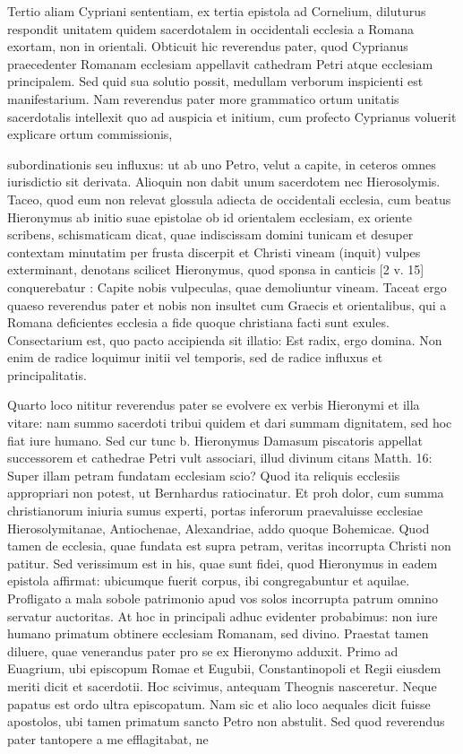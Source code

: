 Tertio aliam Cypriani sententiam, ex tertia epistola ad Cornelium, diluturus respondit unitatem quidem sacerdotalem in occidentali ecclesia a Romana exortam, non in orientali. Obticuit hic reverendus pater, quod Cyprianus praecedenter Romanam ecclesiam appellavit cathedram Petri atque ecclesiam principalem. Sed quid sua solutio possit, medullam verborum inspicienti est manifestarium. Nam reverendus pater more grammatico ortum unitatis sacerdotalis intellexit quo ad auspicia et initium, cum profecto Cyprianus voluerit explicare ortum commissionis,

subordinationis seu influxus: ut ab uno Petro, velut a capite, in ceteros omnes iurisdictio sit derivata. Alioquin non dabit unum sacerdotem nec Hierosolymis. Taceo, quod eum non relevat glossula adiecta de occidentali ecclesia, cum beatus Hieronymus ab initio suae epistolae ob id orientalem ecclesiam, ex oriente scribens, schismaticam dicat, quae indiscissam domini tunicam et desuper contextam minutatim per frusta discerpit et Christi vineam (inquit) vulpes exterminant, denotans scilicet Hieronymus, quod sponsa in canticis [2 v. 15] conquerebatur \marginpar{\small[262]}: Capite nobis vulpeculas, quae demoliuntur vineam. Taceat ergo quaeso reverendus pater et nobis non insultet cum Graecis et orientalibus, qui a Romana deficientes ecclesia a fide quoque christiana facti sunt exules. Consectarium est, quo pacto accipienda sit illatio: Est radix, ergo domina. Non enim de radice loquimur initii vel temporis, sed de radice influxus et principalitatis.

Quarto loco nititur reverendus pater se evolvere ex verbis Hieronymi et illa vitare: nam summo sacerdoti tribui quidem et dari summam dignitatem, sed hoc fiat iure humano. Sed cur tunc b. Hieronymus Damasum piscatoris appellat successorem et cathedrae Petri vult associari, illud divinum citans Matth. 16: Super illam petram fundatam ecclesiam scio? Quod ita reliquis ecclesiis appropriari non potest, ut Bernhardus ratiocinatur. Et proh dolor, cum summa christianorum iniuria sumus experti, portas inferorum praevaluisse ecclesiae Hierosolymitanae, Antiochenae, Alexandriae, addo quoque Bohemicae. Quod tamen de ecclesia, quae fundata est supra petram, veritas incorrupta Christi non patitur. Sed verissimum est in his, quae sunt fidei, quod Hieronymus in eadem epistola affirmat: ubicumque fuerit corpus, ibi congregabuntur et aquilae. Profligato a mala sobole patrimonio apud vos solos incorrupta patrum omnino servatur auctoritas. At hoc in principali adhuc evidenter probabimus: non iure humano primatum obtinere ecclesiam Romanam, sed divino. Praestat tamen diluere, quae venerandus pater pro se ex Hieronymo adduxit. Primo ad Euagrium, ubi episcopum Romae et Eugubii, Constantinopoli et Regii eiusdem meriti dicit et sacerdotii. Hoc scivimus, antequam Theognis nasceretur. Neque papatus est ordo ultra episcopatum. Nam sic et alio loco aequales dicit fuisse apostolos, ubi tamen primatum sancto Petro non abstulit. Sed quod reverendus pater tantopere a me efflagitabat, ne

